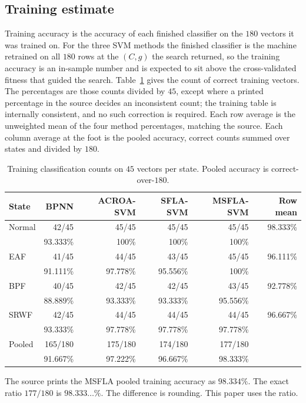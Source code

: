\subsection{Training estimate}

Training accuracy is the accuracy of each finished classifier on the \(180\) vectors it was trained on.
For the three SVM methods the finished classifier is the machine retrained on all \(180\) rows at the \((C, g)\) the search returned, so the training accuracy is an in-sample number and is expected to sit above the cross-validated fitness that guided the search.
Table~\ref{tab:train} gives the count of correct training vectors.
The percentages are those counts divided by \(45\), except where a printed percentage in the source decides an inconsistent count; the training table is internally consistent, and no such correction is required.
Each row average is the unweighted mean of the four method percentages, matching the source.
Each column average at the foot is the pooled accuracy, correct counts summed over states and divided by \(180\).

\begin{table}[H]
\centering
\caption{Training classification counts on \(45\) vectors per state. Pooled accuracy is correct-over-\(180\).}
\label{tab:train}
\begin{tabular}{lrrrrr}
\toprule
State & BPNN & ACROA-SVM & SFLA-SVM & MSFLA-SVM & Row mean \\
\midrule
Normal & 42/45 & 45/45 & 45/45 & 45/45 & 98.333\% \\
 & 93.333\% & 100\% & 100\% & 100\% & \\
EAF & 41/45 & 44/45 & 43/45 & 45/45 & 96.111\% \\
 & 91.111\% & 97.778\% & 95.556\% & 100\% & \\
BPF & 40/45 & 42/45 & 42/45 & 43/45 & 92.778\% \\
 & 88.889\% & 93.333\% & 93.333\% & 95.556\% & \\
SRWF & 42/45 & 44/45 & 44/45 & 44/45 & 96.667\% \\
 & 93.333\% & 97.778\% & 97.778\% & 97.778\% & \\
\midrule
Pooled & 165/180 & 175/180 & 174/180 & 177/180 & \\
 & 91.667\% & 97.222\% & 96.667\% & 98.333\% & \\
\bottomrule
\end{tabular}
\end{table}

The source prints the MSFLA pooled training accuracy as \(98.334\%\).
The exact ratio \(177/180\) is \(98.333\ldots\%\).
The difference is rounding.
This paper uses the ratio.

